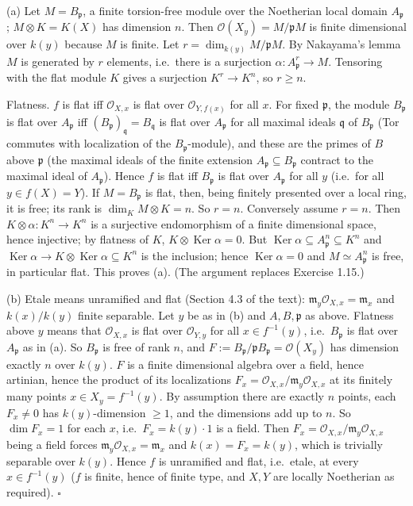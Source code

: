 \documentclass[11pt]{article}
\begin{document}
(a) Let $M=B_\mathfrak{p}$, a finite torsion-free module over the Noetherian local domain $A_\mathfrak{p}$; $M\otimes K=K(X)$ has dimension $n$. Then $\mathcal{O}(X_y)=M/\mathfrak{p}M$ is finite dimensional over $k(y)$ because $M$ is finite. Let $r=\dim_{k(y)}M/\mathfrak{p}M$. By Nakayama's lemma $M$ is generated by $r$ elements, i.e.\ there is a surjection $\alpha:A_\mathfrak{p}^r\to M$. Tensoring with the flat module $K$ gives a surjection $K^r\to K^n$, so $r\ge n$.

Flatness. $f$ is flat iff $\mathcal{O}_{X,x}$ is flat over $\mathcal{O}_{Y,f(x)}$ for all $x$. For fixed $\mathfrak{p}$, the module $B_\mathfrak{p}$ is flat over $A_\mathfrak{p}$ iff $(B_\mathfrak{p})_\mathfrak{q}=B_\mathfrak{q}$ is flat over $A_\mathfrak{p}$ for all maximal ideals $\mathfrak{q}$ of $B_\mathfrak{p}$ (Tor commutes with localization of the $B_\mathfrak{p}$-module), and these are the primes of $B$ above $\mathfrak{p}$ (the maximal ideals of the finite extension $A_\mathfrak{p}\subseteq B_\mathfrak{p}$ contract to the maximal ideal of $A_\mathfrak{p}$). Hence $f$ is flat iff $B_\mathfrak{p}$ is flat over $A_\mathfrak{p}$ for all $y$ (i.e.\ for all $y\in f(X)=Y$).
If $M=B_\mathfrak{p}$ is flat, then, being finitely presented over a local ring, it is free; its rank is $\dim_K M\otimes K=n$. So $r=n$. Conversely assume $r=n$. Then $K\otimes\alpha:K^n\to K^n$ is a surjective endomorphism of a finite dimensional space, hence injective; by flatness of $K$, $K\otimes\operatorname{Ker}\alpha=0$. But $\operatorname{Ker}\alpha\subseteq A_\mathfrak{p}^n\subseteq K^n$ and $\operatorname{Ker}\alpha\to K\otimes\operatorname{Ker}\alpha\subseteq K^n$ is the inclusion; hence $\operatorname{Ker}\alpha=0$ and $M\simeq A_\mathfrak{p}^n$ is free, in particular flat. This proves (a). (The argument replaces Exercise 1.15.)

(b) Etale means unramified and flat (Section 4.3 of the text): $\mathfrak{m}_y\mathcal{O}_{X,x}=\mathfrak{m}_x$ and $k(x)/k(y)$ finite separable. Let $y$ be as in (b) and $A,B,\mathfrak{p}$ as above. Flatness above $y$ means that $\mathcal{O}_{X,x}$ is flat over $\mathcal{O}_{Y,y}$ for all $x\in f^{-1}(y)$, i.e.\ $B_\mathfrak{p}$ is flat over $A_\mathfrak{p}$ as in (a). So $B_\mathfrak{p}$ is free of rank $n$, and $F:=B_\mathfrak{p}/\mathfrak{p}B_\mathfrak{p}=\mathcal{O}(X_y)$ has dimension exactly $n$ over $k(y)$. $F$ is a finite dimensional algebra over a field, hence artinian, hence the product of its localizations $F_x=\mathcal{O}_{X,x}/\mathfrak{m}_y\mathcal{O}_{X,x}$ at its finitely many points $x\in X_y=f^{-1}(y)$. By assumption there are exactly $n$ points, each $F_x\ne0$ has $k(y)$-dimension $\ge1$, and the dimensions add up to $n$. So $\dim F_x=1$ for each $x$, i.e.\ $F_x=k(y)\cdot1$ is a field. Then $F_x=\mathcal{O}_{X,x}/\mathfrak{m}_y\mathcal{O}_{X,x}$ being a field forces $\mathfrak{m}_y\mathcal{O}_{X,x}=\mathfrak{m}_x$ and $k(x)=F_x=k(y)$, which is trivially separable over $k(y)$. Hence $f$ is unramified and flat, i.e.\ etale, at every $x\in f^{-1}(y)$ ($f$ is finite, hence of finite type, and $X,Y$ are locally Noetherian as required). \hfill$\square$
\end{document}
